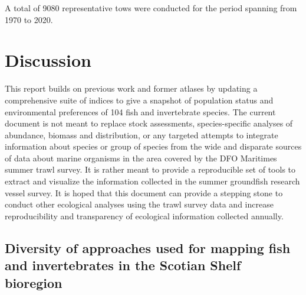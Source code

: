 \documentclass[12pt]{article}\usepackage[]{graphicx}\usepackage[]{color}
\begin{document}
A total of 9080 representative tows were conducted for the period spanning from 1970 to 2020.

\hypertarget{discussion}{%
\section{Discussion}\label{discussion}}

This report builds on previous work and former atlases by updating a comprehensive suite of indices to give a snapshot of population status and environmental preferences of 104 fish and invertebrate species. The current document is not meant to replace stock assessments, species-specific analyses of abundance, biomass and distribution, or any targeted attempts to integrate information about species or group of species from the wide and disparate sources of data about marine organisms in the area covered by the DFO Maritimes summer trawl survey. It is rather meant to provide a reproducible set of tools to extract and visualize the information collected in the summer groundfish research vessel survey. It is hoped that this document can provide a stepping stone to conduct other ecological analyses using the trawl survey data and increase reproducibility and transparency of ecological information collected annually.

\hypertarget{diversity-of-approaches-used-for-mapping-fish-and-invertebrates-in-the-scotian-shelf-bioregion}{%
\subsection{Diversity of approaches used for mapping fish and invertebrates in the Scotian Shelf bioregion}\label{diversity-of-approaches-used-for-mapping-fish-and-invertebrates-in-the-scotian-shelf-bioregion}}
\end{document}
